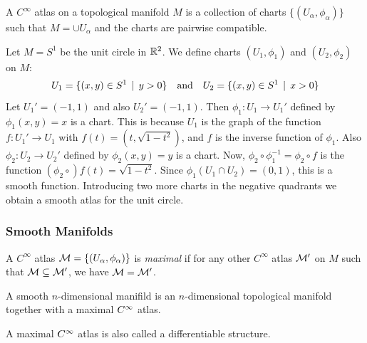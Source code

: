 \begin{frame}
  \begin{defn}
    A $C^{\infty}$ atlas on a topological manifold $M$ is a collection of 
    charts $\{(U_\alpha, \phi_\alpha)\}$ such that $M = \cup U_\alpha$
    and the charts are pairwise compatible.
  \end{defn}
  \begin{example}
    Let $M = S^1$ be the unit circle in $\mathbb R^2$.
    We define charts $(U_1, \phi_1)$ and $(U_2, \phi_2)$ on $M$:
    \begin{displaymath}
      U_1 = \{(x, y) \in S^1 \, \mid \, y > 0\} \quad 
      \text{and} \quad
      U_2 = \{(x, y) \in S^1 \, \mid \, x > 0\}
    \end{displaymath}
    Let $U_1' = (-1, 1)$ and also $U_2' = (-1, 1)$. Then $\phi_1 \colon
    U_1 \to U_1'$ defined by $\phi_1(x,y) = x$
    is a chart. This is because $U_1$ is the graph of the function
    $f \colon U_1' \to U_1$ with $f(t) = (t, \sqrt{1-t^2})$, and $f$
    is the inverse function of $\phi_1$. Also
    $\phi_2
    \colon U_2 \to U_2'$ defined by $\phi_2(x,y) = y$ is a chart.
    Now, $\phi_2 \circ \phi_1^{-1}  = \phi_2 \circ f$ is the 
    function $(\phi_2\circ) f(t) = \sqrt{1 - t^2}$.
    Since $\phi_1(U_1 \cap U_2) = (0, 1)$, this is a smooth
    function.
    Introducing two more charts in the negative quadrants we obtain a
    smooth atlas for the unit circle.
  \end{example}
\end{frame}
\begin{frame}
  \frametitle{Smooth Manifolds}
  \begin{defn}
    A $C^{\infty}$ atlas $\mathcal M = \{(U_\alpha, \phi_\alpha)\}$
    is {\em maximal} if for any other $C^{\infty}$ atlas $\mathcal M'$ on 
    $M$ such that $\mathcal M \subseteq \mathcal M'$, we have $\mathcal M = \mathcal M'$.
  \end{defn}
  \begin{defn}
    A smooth $n$-dimensional manifild is an $n$-dimensional
    topological manifold together with a maximal $C^{\infty}$
    atlas.
  \end{defn}
  A maximal $C^{\infty}$ atlas is also called a differentiable structure.
\end{frame}
